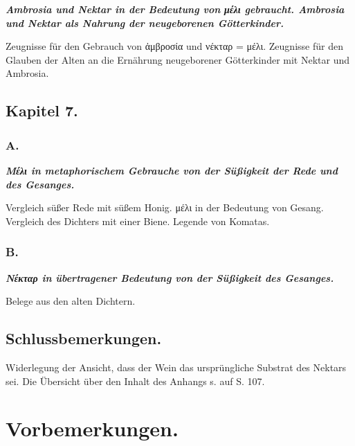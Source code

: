 \documentclass[a4paper, 11pt, oneside]{article}
\begin{document}
\textbf{\emph{Ambrosia und Nektar in der Bedeutung von μέλι gebraucht. Ambrosia und Nektar als Nahrung der neugeborenen Götterkinder.}}

Zeugnisse für den Gebrauch von ἀμβροσία und νέκταρ = μέλι. Zeugnisse für den Glauben der Alten an die Ernährung neugeborener Götterkinder mit Nektar und Ambrosia.

\subsection*{Kapitel 7.}

\subsubsection*{A.}

\textbf{\emph{Μέλι in metaphorischem Gebrauche von der Süßigkeit der Rede und des Gesanges.}}

Vergleich süßer Rede mit süßem Honig. μέλι in der Bedeutung von Gesang. Vergleich des Dichters mit einer Biene. Legende von Komatas.

\subsubsection*{B.}

\textbf{\emph{Νέκταρ in übertragener Bedeutung von der Süßigkeit des Gesanges.}}

Belege aus den alten Dichtern.

\subsection*{Schlussbemerkungen.}

Widerlegung der Ansicht, dass der Wein das ursprüngliche Substrat des Nektars sei. Die Übersicht über den Inhalt des Anhangs s. auf S. 107.
\clearpage
\section*{Vorbemerkungen.}
\end{document}
